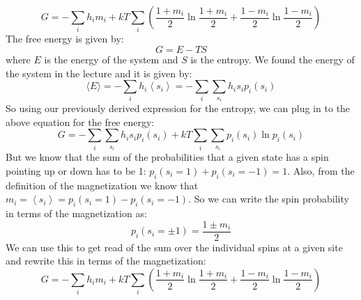 \documentclass[12pt]{article}
\begin{document}
\begin{equation*}
G=-\sum_{i} h_{i} m_{i}+k T \sum_{i}\left(\frac{1+m_{i}}{2} \ln \frac{1+m_{i}}{2}+\frac{1-m_{i}}{2} \ln \frac{1-m_{i}}{2}\right) \tag{2}
\end{equation*}
The free energy is given by:
\begin{equation}
G=E-TS
\end{equation}
where $E$ is the energy of the system and $S$ is the entropy. We found the energy of the system in the lecture and it is given by:
\begin{equation}
\langle E\rangle=-\sum_i h_i\left\langle s_i\right\rangle=-\sum_i \sum_{s_i} h_i s_i p_i\left(s_i\right)
\end{equation}
So using our previously derived expression for the entropy, we can plug in to the above equation for the free energy:
\begin{equation}
G=-\sum_i \sum_{s_i} h_i s_i p_i\left(s_i\right)+kT\sum_i \sum_{s_i} p_i\left(s_i\right) \ln p_i\left(s_i\right)
\end{equation}
But we know that the sum of the probabilities that a given state has a spin pointing up or down has to be 1: $p_i\left(s_i=1\right)+p_i\left(s_i=-1\right)=1$. Also, from the definition of the magnetization we know that $m_i=\left\langle s_i\right\rangle=p_i\left(s_i=1\right)-p_i\left(s_i=-1\right)$. So we can write the spin probability in terms of the magnetization as:
\begin{equation}
p_i\left(s_i=\pm1\right)=\frac{1\pm m_i}{2}
\end{equation}
We can use this to get read of the sum over the individual spins at a given site and rewrite this in terms of the magnetization:
\begin{equation}
G=-\sum_i h_i m_i+kT\sum_i \left(\frac{1+m_i}{2} \ln \frac{1+m_i}{2}+\frac{1-m_i}{2} \ln \frac{1-m_i}{2}\right)
\end{equation}
\subsection{}
\end{document}
